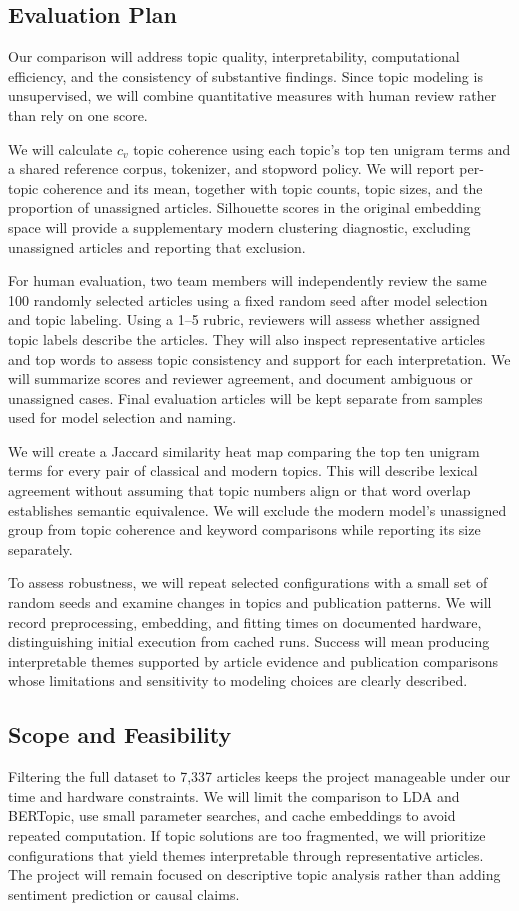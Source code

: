 \documentclass{article}
\begin{document}
\subsection*{Evaluation Plan}
Our comparison will address topic quality, interpretability, computational efficiency, and the consistency of substantive findings. Since topic modeling is unsupervised, we will combine quantitative measures with human review rather than rely on one score.

We will calculate $c_v$ topic coherence using each topic's top ten unigram terms and a shared reference corpus, tokenizer, and stopword policy. We will report per-topic coherence and its mean, together with topic counts, topic sizes, and the proportion of unassigned articles. Silhouette scores in the original embedding space will provide a supplementary modern clustering diagnostic, excluding unassigned articles and reporting that exclusion.

For human evaluation, two team members will independently review the same 100 randomly selected articles using a fixed random seed after model selection and topic labeling. Using a 1--5 rubric, reviewers will assess whether assigned topic labels describe the articles. They will also inspect representative articles and top words to assess topic consistency and support for each interpretation. We will summarize scores and reviewer agreement, and document ambiguous or unassigned cases. Final evaluation articles will be kept separate from samples used for model selection and naming.

We will create a Jaccard similarity heat map comparing the top ten unigram terms for every pair of classical and modern topics. This will describe lexical agreement without assuming that topic numbers align or that word overlap establishes semantic equivalence. We will exclude the modern model's unassigned group from topic coherence and keyword comparisons while reporting its size separately.

To assess robustness, we will repeat selected configurations with a small set of random seeds and examine changes in topics and publication patterns. We will record preprocessing, embedding, and fitting times on documented hardware, distinguishing initial execution from cached runs. Success will mean producing interpretable themes supported by article evidence and publication comparisons whose limitations and sensitivity to modeling choices are clearly described.


\subsection*{Scope and Feasibility}
Filtering the full dataset to 7,337 articles keeps the project manageable under our time and hardware constraints. We will limit the comparison to LDA and BERTopic, use small parameter searches, and cache embeddings to avoid repeated computation. If topic solutions are too fragmented, we will prioritize configurations that yield themes interpretable through representative articles. The project will remain focused on descriptive topic analysis rather than adding sentiment prediction or causal claims.
\end{document}
